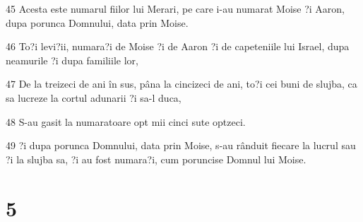 \par 45 Acesta este numarul fiilor lui Merari, pe care i-au numarat Moise ?i Aaron, dupa porunca Domnului, data prin Moise.
\par 46 To?i levi?ii, numara?i de Moise ?i de Aaron ?i de capeteniile lui Israel, dupa neamurile ?i dupa familiile lor,
\par 47 De la treizeci de ani în sus, pâna la cincizeci de ani, to?i cei buni de slujba, ca sa lucreze la cortul adunarii ?i sa-l duca,
\par 48 S-au gasit la numaratoare opt mii cinci sute optzeci.
\par 49 ?i dupa porunca Domnului, data prin Moise, s-au rânduit fiecare la lucrul sau ?i la slujba sa, ?i au fost numara?i, cum poruncise Domnul lui Moise.

\chapter{5}

